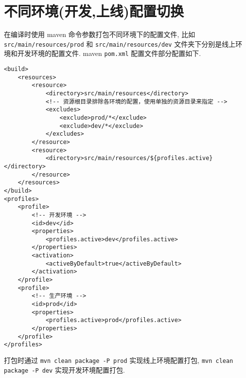 \section{不同环境(开发,上线)配置切换}\label{ux4e0dux540cux73afux5883ux5f00ux53d1ux4e0aux7ebfux914dux7f6eux5207ux6362}

在编译时使用 maven 命令参数打包不同环境下的配置文件, 比如
\lstinline!src/main/resources/prod! 和
\lstinline!src/main/resources/dev!
文件夹下分别是线上环境和开发环境的配置文件. maven \lstinline!pom.xml!
配置文件部分配置如下.

\begin{lstlisting}
<build>
    <resources>
        <resource>
            <directory>src/main/resources</directory>
            <!-- 资源根目录排除各环境的配置，使用单独的资源目录来指定 -->
            <excludes>
                <exclude>prod/*</exclude>
                <exclude>dev/*</exclude>
            </excludes>
        </resource>
        <resource>
            <directory>src/main/resources/${profiles.active}</directory>
        </resource>
    </resources>
</build>
<profiles>
    <profile>
        <!-- 开发环境 -->
        <id>dev</id>
        <properties>
            <profiles.active>dev</profiles.active>
        </properties>
        <activation>
            <activeByDefault>true</activeByDefault>
        </activation>
    </profile>
    <profile>
        <!-- 生产环境 -->
        <id>prod</id>
        <properties>
            <profiles.active>prod</profiles.active>
        </properties>
    </profile>
</profiles>
\end{lstlisting}

打包时通过 \lstinline!mvn clean package -P prod! 实现线上环境配置打包,
\lstinline!mvn clean package -P dev! 实现开发环境配置打包.
